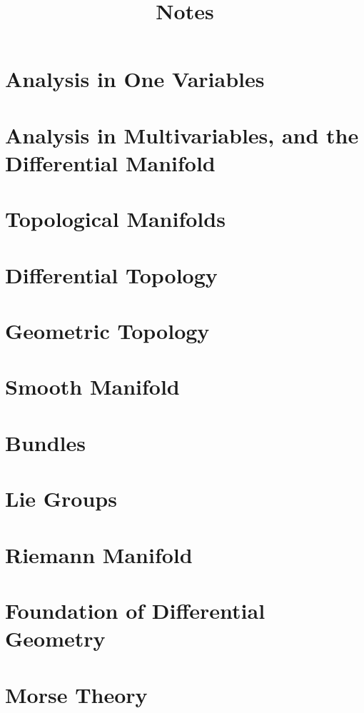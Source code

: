 \documentclass{ModulEN}
\title{Notes}
\begin{document}
	\maketitle
	\tableofcontents
	\part{Analysis in One Variables}
		
	
	\part{Analysis in Multivariables, and the Differential Manifold}
	
	\part{Topological Manifolds}
	
	\part{Differential Topology}
	
	\part{Geometric Topology}
		
	\part{Smooth Manifold}
		
		
	\part{Bundles}
		
	\part{Lie Groups}
	\part{Riemann Manifold}
	
		
	
	
	\part{Foundation of Differential Geometry}
		
	\part{Morse Theory}
		
	
\end{document}
